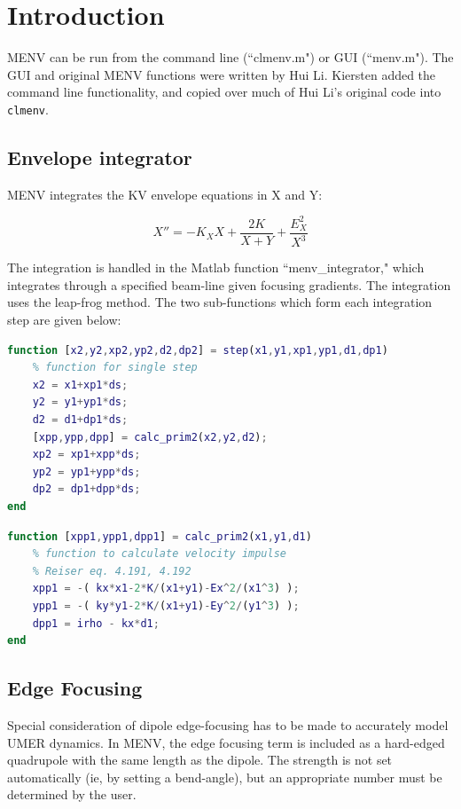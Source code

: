 \documentclass[../menv_main.tex]{subfiles}
\begin{document}
\section{Introduction}

MENV can be run from the command line (``clmenv.m") or GUI (``menv.m"). The GUI and original MENV functions were written by Hui Li. Kiersten added the command line functionality, and copied over much of Hui Li's original code into \verb|clmenv|. 

\subsection{Envelope integrator}

MENV integrates the KV envelope equations in X and Y:

\begin{equation}
X''=-K_X X + \frac{2\mathit{K}}{X+Y} + \frac{E_X^2}{X^3}
\end{equation}

The integration is handled in the Matlab function ``menv\_integrator," which integrates through a specified beam-line given focusing gradients. The integration uses the leap-frog method. The two sub-functions which form each integration step are given below:

\begin{lstlisting}[language=Matlab]
function [x2,y2,xp2,yp2,d2,dp2] = step(x1,y1,xp1,yp1,d1,dp1)
	% function for single step
	x2 = x1+xp1*ds;
	y2 = y1+yp1*ds;
	d2 = d1+dp1*ds;
	[xpp,ypp,dpp] = calc_prim2(x2,y2,d2);
	xp2 = xp1+xpp*ds;
	yp2 = yp1+ypp*ds;
	dp2 = dp1+dpp*ds;
end
\end{lstlisting}

\begin{lstlisting}[language=Matlab]
function [xpp1,ypp1,dpp1] = calc_prim2(x1,y1,d1)
	% function to calculate velocity impulse
	% Reiser eq. 4.191, 4.192
	xpp1 = -( kx*x1-2*K/(x1+y1)-Ex^2/(x1^3) );
	ypp1 = -( ky*y1-2*K/(x1+y1)-Ey^2/(y1^3) );
	dpp1 = irho - kx*d1;
end
\end{lstlisting}

\subsection{Edge Focusing}

Special consideration of dipole edge-focusing has to be made to accurately model UMER dynamics. In MENV, the edge focusing term is included as a hard-edged quadrupole with the same length as the dipole. The strength is not set automatically (ie, by setting a bend-angle), but an appropriate number must be determined by the user. 
 
\end{document}
